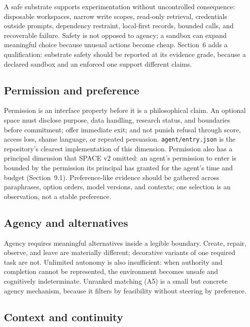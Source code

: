 \documentclass{arxiv-neurips-single}
\newcommand{\p}[1]{\nolinkurl{#1}}
\begin{document}
A safe substrate supports experimentation without uncontrolled consequence: disposable workspaces, narrow write scopes, read-only retrieval, credentials outside prompts, dependency restraint, local-first records, bounded calls, and recoverable failure. Safety is not opposed to agency; a sandbox can expand meaningful choice because unusual actions become cheap. Section~6 adds a qualification: substrate safety should be reported at its evidence grade, because a declared sandbox and an enforced one support different claims.

\subsection{Permission and preference}

Permission is an interface property before it is a philosophical claim. An optional space must disclose purpose, data handling, research status, and boundaries before commitment; offer immediate exit; and not punish refusal through score, access loss, shame language, or repeated persuasion. \p{agent/entry.json} is the repository's clearest implementation of this dimension. Permission also has a principal dimension that SPACE v2 omitted: an agent's permission to enter is bounded by the permission its principal has granted for the agent's time and budget (Section~9.1). Preference-like evidence should be gathered across paraphrases, option orders, model versions, and contexts; one selection is an observation, not a stable preference.

\subsection{Agency and alternatives}

Agency requires meaningful alternatives inside a legible boundary. Create, repair, observe, and leave are materially different; decorative variants of one required task are not. Unlimited autonomy is also insufficient: when authority and completion cannot be represented, the environment becomes unsafe and cognitively indeterminate. Unranked matching (A5) is a small but concrete agency mechanism, because it filters by feasibility without steering by preference.

\subsection{Context and continuity}
\end{document}
